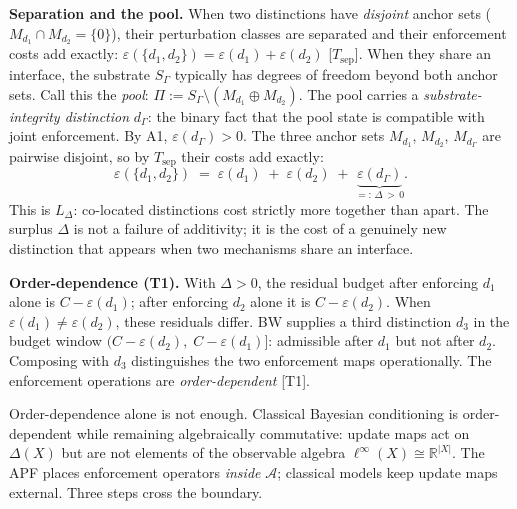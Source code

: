 \documentclass[11pt]{article}
\theoremstyle{remark}
\begin{document}
\noindent\textbf{Separation and the pool.}  When two distinctions have
\emph{disjoint} anchor sets ($M_{d_1} \cap M_{d_2} = \{0\}$), their
perturbation classes are separated and their enforcement costs add exactly:
$\varepsilon(\{d_1,d_2\}) = \varepsilon(d_1) + \varepsilon(d_2)$
[$T_{\mathrm{sep}}$].  When they share an interface, the substrate $S_\Gamma$
typically has degrees of freedom beyond both anchor sets.  Call this the
\emph{pool}: $\Pi := S_\Gamma \setminus (M_{d_1} \oplus M_{d_2})$.  The pool
carries a \emph{substrate-integrity distinction} $d_\Gamma$: the binary fact
that the pool state is compatible with joint enforcement.  By A1,
$\varepsilon(d_\Gamma) > 0$.  The three anchor sets $M_{d_1}$, $M_{d_2}$,
$M_{d_\Gamma}$ are pairwise disjoint, so by $T_{\mathrm{sep}}$ their costs add
exactly:
\[
\varepsilon(\{d_1,d_2\}) \;=\; \varepsilon(d_1) \;+\; \varepsilon(d_2) \;+\; \underbrace{\varepsilon(d_\Gamma)}_{=:\,\Delta\,>\,0}.
\]
This is $L_\Delta$: co-located distinctions cost strictly more together than
apart.  The surplus $\Delta$ is not a failure of additivity; it is the
cost of a genuinely new distinction that appears when two mechanisms share
an interface.

\medskip

\noindent\textbf{Order-dependence (T1).}  With $\Delta > 0$, the residual
budget after enforcing $d_1$ alone is $C - \varepsilon(d_1)$; after enforcing
$d_2$ alone it is $C - \varepsilon(d_2)$.  When $\varepsilon(d_1) \ne
\varepsilon(d_2)$, these residuals differ.  BW supplies a third distinction
$d_3$ in the budget window $(C - \varepsilon(d_2),\; C - \varepsilon(d_1)]$:
admissible after $d_1$ but not after $d_2$.  Composing with $d_3$
distinguishes the two enforcement maps operationally.  The enforcement
operations are \emph{order-dependent} [T1].

Order-dependence alone is not enough.  Classical Bayesian conditioning
is order-dependent while remaining algebraically commutative: update maps
act on $\Delta(X)$ but are not elements of the observable algebra
$\ell^\infty(X) \cong \mathbb{R}^{|X|}$.  The APF places enforcement
operators \emph{inside} $\mathcal{A}$; classical models keep update maps
external.  Three steps cross the boundary.

\medskip
\end{document}
